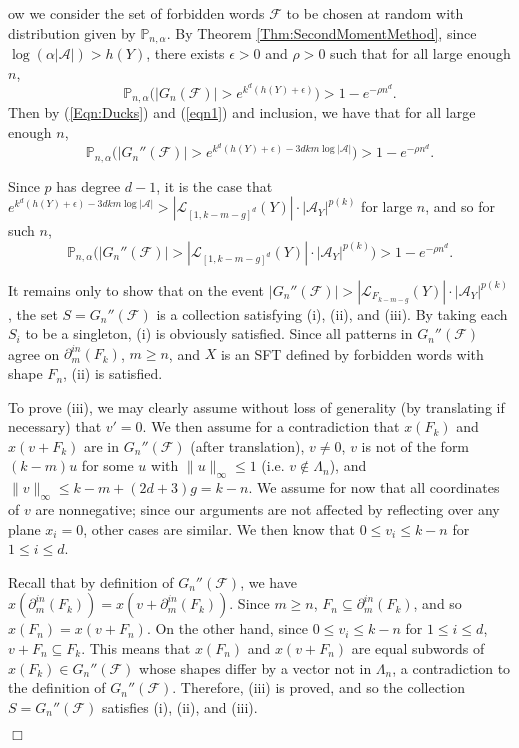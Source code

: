 \documentclass[12pt]{amsart}
\theoremstyle{definition}
\newenvironment{ProofOfFactorThm}[1]
{\par\vskip2\parsep\noindent{\sc Proof of Theorem\ \ref{Thm:Factors}. }}{{\hfill
$\Box$}
\par\vskip2\parsep}
\begin{document}
\begin{ProofOfFactorThm}
Now we consider the set of forbidden words $\mathcal{F}$ to be chosen at random with distribution given by $\mathbb{P}_{n,\alpha}$.
By Theorem \ref{Thm:SecondMomentMethod}, since $\log(\alpha |\mathcal{A}|) > h(Y)$, there exists $\epsilon > 0$ and $\rho>0$ such that for all large enough $n$,  
\begin{equation}\label{eqn1}
\mathbb{P}_{n,\alpha} \bigl(|G_n(\mathcal{F})| > e^{k^d (h(Y) + \epsilon)}\bigr) > 1 - e^{-\rho n^d}.
\end{equation}
Then by (\ref{Eqn:Ducks}) and (\ref{eqn1}) and inclusion, we have that for all large enough $n$,
\begin{equation*}
\mathbb{P}_{n,\alpha} \bigl(|G_n''(\mathcal{F}) | > e^{k^d (h(Y) + \epsilon) - 3dkm \log |\mathcal{A}|} \bigr) > 1 - e^{- \rho n^d}.
\end{equation*}

Since $p$ has degree $d-1$, it is the case that $e^{k^d (h(Y) + \epsilon) - 3dkm \log |\mathcal{A}|} > |\mathcal{L}_{[1,k-m-g]^d}(Y)| \cdot |\mathcal{A}_Y|^{p(k)}$ for large $n$, and so for such $n$,
\begin{equation}\label{eqn2}
\mathbb{P}_{n,\alpha} \bigl(|G_n''(\mathcal{F}) | > |\mathcal{L}_{[1,k-m-g]^d}(Y)| \cdot |\mathcal{A}_Y|^{p(k)} \bigr) > 1 - e^{- \rho n^d}.
\end{equation}

It remains only to show that on the event $|G_n''(\mathcal{F})| > |\mathcal{L}_{F_{k-m-g}}(Y)| \cdot |\mathcal{A}_Y|^{p(k)}$, the set $S = G_n''(\mathcal{F})$ is a collection satisfying (i), (ii), and (iii). By taking each $S_i$ to be a singleton, (i) is obviously satisfied. Since all patterns in $G_n''(\mathcal{F})$ agree on $\partial^{in}_m(F_k)$, $m \geq n$, and $X$ is an SFT defined by forbidden words with shape $F_n$, (ii) is satisfied.

To prove (iii), we may clearly assume without loss of generality (by translating if necessary) that $v' = 0$. We then assume for a contradiction that $x(F_k)$ and $x(v + F_k)$ are in $G_n''(\mathcal{F})$ (after translation), $v \neq 0$, $v$ is not of the form $(k - m)u$ for some $u$ with $\|u\|_{\infty} \leq 1$ (i.e. $v \notin \Lambda_n$), and $\|v\|_{\infty} \leq k - m + (2d+3)g = k - n$. We assume for now that all coordinates of $v$ are nonnegative; since our arguments are not affected by reflecting over any plane $x_i = 0$, other cases are similar. We then know that $0 \leq v_i \leq k - n$ for $1 \leq i \leq d$.

Recall that by definition of $G_n''(\mathcal{F})$, we have $x(\partial^{in}_m(F_k)) = x(v + \partial^{in}_m(F_k))$. 
Since $m \geq n$, $F_n \subseteq \partial^{in}_m(F_k)$, and so $x(F_n) = x(v + F_n)$. On the other hand, since $0 \leq v_i \leq k - n$ for $1 \leq i \leq d$, $v + F_n \subseteq F_k$. This means that $x(F_n)$ and $x(v + F_n)$ are equal subwords of $x(F_k) \in G_n''(\mathcal{F})$ whose shapes differ by a vector not in $\Lambda_n$, a contradiction to the definition of $G_n''(\mathcal{F})$. Therefore, (iii) is proved, and so the collection $S = G_n''(\mathcal{F})$ satisfies (i), (ii), and (iii).

\end{ProofOfFactorThm}
\end{document}
